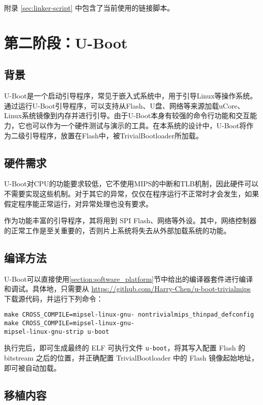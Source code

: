附录 \ref{sec:linker-script} 中包含了当前使用的链接脚本。

\section{第二阶段：U-Boot}

\subsection{背景}
U-Boot是一个启动引导程序，常见于嵌入式系统中，用于引导Linux等操作系统。通过运行U-Boot引导程序，可以支持从Flash、U盘、网络等来源加载uCore、Linux系统镜像到内存并进行引导。由于U-Boot本身有较强的命令行功能和交互能力，它也可以作为一个硬件测试与演示的工具。在本系统的设计中，U-Boot将作为二级引导程序，放置在Flash中，被TrivialBootloader所加载。

\subsection{硬件需求}

U-Boot对CPU的功能要求较低，它不使用MIPS的中断和TLB机制，因此硬件可以不需要实现这些机制。对于其它的异常，仅仅在程序运行不正常时才会发生，如果假定程序能正常运行，对异常处理也没有要求。

作为功能丰富的引导程序，其将用到 SPI Flash、网络等外设。其中，网络控制器的正常工作是至关重要的，否则片上系统将失去从外部加载系统的功能。

\subsection{编译方法}

U-Boot可以直接使用\ref{section:software_platform}节中给出的编译器套件进行编译和调试。具体地，只需要从 \url{https://github.com/Harry-Chen/u-boot-trivialmips} 下载源代码，并运行下列命令：

\begin{verbatim}
make CROSS_COMPILE=mipsel-linux-gnu- nontrivialmips_thinpad_defconfig
make CROSS_COMPILE=mipsel-linux-gnu-
mipsel-linux-gnu-strip u-boot
\end{verbatim}

执行完后，即可生成最终的 ELF 可执行文件 \texttt{u-boot}，将其写入配置 Flash 的 bitstream 之后的位置，并正确配置 TrivialBootloader 中的 Flash 镜像起始地址，即可被自动加载。

\subsection{移植内容}

